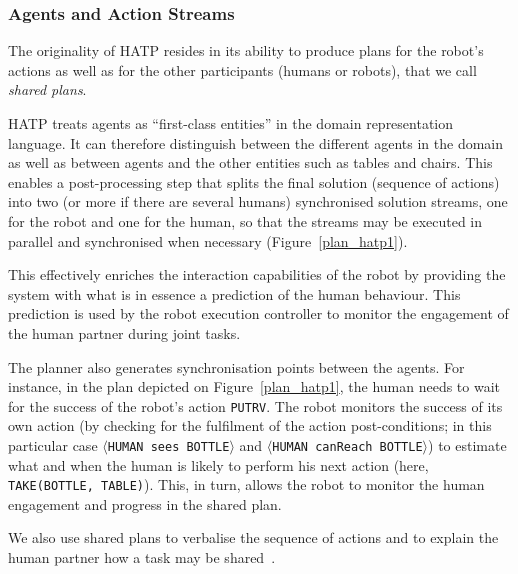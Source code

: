 \documentclass[preprint,3p,times]{elsarticle}
\newcommand{\concept}[1]{{\small \texttt{#1}}}
\newcommand{\stmt}[1]{{\footnotesize\tt$\langle$#1\relax$\rangle$}}
\begin{document}
\subsubsection{Agents and Action Streams}

The originality of HATP resides in its ability to produce plans for the robot's
actions as well as for the other participants (humans or robots), that we
call \emph{shared plans}. 

HATP treats agents as ``first-class
entities'' in the domain representation language. It can therefore
distinguish between the different agents in the domain as well as
between agents and the other entities such as tables and chairs. This
enables a post-processing step that splits the final
solution (sequence of actions) into two (or more if there are several
humans) synchronised solution
streams, one for the robot and one for the human, so that the streams may be executed in
parallel and synchronised when necessary (Figure~\ref{plan_hatp1}).

This effectively enriches the interaction capabilities of the robot by providing
the system with what is in essence a prediction of the human behaviour. This
prediction is used by the robot execution controller to monitor the engagement
of the human partner during joint tasks.

The planner also generates synchronisation points between the agents. For
instance, in the plan depicted on Figure~\ref{plan_hatp1}, the human needs to
wait for the success of the robot's action {\tt PUTRV}. The robot monitors the
success of its own action (by checking for the fulfilment of the action
post-conditions; in this particular case \stmt{HUMAN sees BOTTLE} and
\stmt{HUMAN canReach BOTTLE}) to estimate what and when the human is likely to
perform his next action (here, \concept{TAKE(BOTTLE, TABLE)}). This, in turn,
allows the robot to monitor the human engagement and progress in the shared
plan.

We also use shared plans to verbalise the sequence of actions and to explain
the human partner how a task may be shared~\cite{warnier2012when}.
\end{document}
